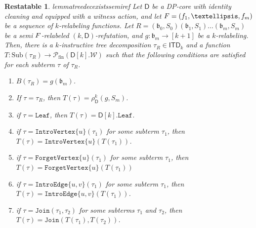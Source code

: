 \documentclass[10pt,a4paper]{amsart}
\newtheorem{restatable}{Restatable}
\newcommand{\abag}{\mathfrak{b}}
\newcommand{\abstractdecomposition}{\tau}
\newcommand{\action}{\rho}
\newcommand{\allabstractdecompositionstreewidth}[1]{\mathsf{ITD}_{#1}}
\newcommand{\allsubterms}{\mathrm{Sub}}
\newcommand{\allwitnesses}{\mathcal{W}}
\newcommand{\dpcore}{\mathsf{D}}
\newcommand{\dprefutation}{R}
\newcommand{\finitepowerset}[1]{\mathcal{P}_{\mathrm{fin}}(#1)}
\newcommand{\forgetvertextype}[1]{\mathtt{ForgetVertex}\{#1\}}
\newcommand{\initialsetgeneric}{\mathtt{Leaf}}
\newcommand{\introedgegeneric}[2]{\mathtt{IntroEdge}\{#1,#2\}}
\newcommand{\introvertextype}[1]{\mathtt{IntroVertex}\{#1\}}
\newcommand{\jointype}{\mathtt{Join}}
\newcommand{\leaftype}{\mathtt{Leaf}}
\newcommand{\relabelingfunction}{f}
\newcommand{\relabelsequence}{\textsc{F}}
\newcommand{\subtermToBag}{T}
\newcommand{\topbag}[1]{\topbagname(#1)}
\newcommand{\topbagname}{B}
\newcommand{\treewidthvalue}{k}
\newcommand{\vertexone}{u}
\newcommand{\vertextwo}{v}
\newcommand{\witnessset}{S}
\begin{document}
		\begin{restatable}{lemma}{treedecexistssemiref}
		\label{lemma:tree decomposition-existence-sequence-relabel-semi-refutation}
		Let $\dpcore$ be a DP-core with identity cleaning and equipped with a witness action, and let $\relabelsequence=(\relabelingfunction_1,\dots,\relabelingfunction_m)$ be a sequence of $k$-relabeling functions. Let  $\dprefutation =(\abag_0,\witnessset_0)(\abag_1,\witnessset_1)\dots(\abag_m,\witnessset_m)$ be a semi $\relabelsequence$-relabeled $(\treewidthvalue,\dpcore)$-refutation, and $g:\abag_m\to [\treewidthvalue+1]$ be a $\treewidthvalue$-relabeling.
	Then, there is a $\treewidthvalue$-instructive tree decomposition $\abstractdecomposition_{\dprefutation}\in \allabstractdecompositionstreewidth{\treewidthvalue}$ and a function
	$\subtermToBag: \allsubterms(\abstractdecomposition_{\dprefutation}) \to \finitepowerset{\dpcore[\treewidthvalue].\allwitnesses}$
	such that the following conditions are satisfied for each subterm $\abstractdecomposition$ of $\abstractdecomposition_{\dprefutation}$.
\begin{enumerate}
    \item\label{existenceZero} $\topbag{\abstractdecomposition_{\dprefutation}} = g(\abag_m)$.
    \item\label{existenceOne} If $\abstractdecomposition=\abstractdecomposition_{\dprefutation}$, then $\subtermToBag(\abstractdecomposition) = \action_{\dpcore}^{\treewidthvalue}(g,\witnessset_m)$.
    \item\label{existenceTwo} if $\abstractdecomposition = \leaftype$, then
    $\subtermToBag(\abstractdecomposition) = \dpcore[\treewidthvalue].\initialsetgeneric$.
    \item\label{existenceThree} if $\abstractdecomposition = \introvertextype{\vertexone}(\abstractdecomposition_1)$ for some subterm $\abstractdecomposition_1$, then
    $\subtermToBag(\abstractdecomposition) = \introvertextype{\vertexone}(\subtermToBag(\abstractdecomposition_1))$.
    \item\label{existenceFour} if $\abstractdecomposition = \forgetvertextype{\vertexone}(\abstractdecomposition_1)$ for some subterm $\abstractdecomposition_1$, then
    $\subtermToBag(\abstractdecomposition) = \forgetvertextype{\vertexone}(\subtermToBag(\abstractdecomposition_1))$
    \item\label{existenceFive} if $\abstractdecomposition = \introedgegeneric{\vertexone}{\vertextwo}(\abstractdecomposition_1)$ for some subterm $\abstractdecomposition_1$, then
    $\subtermToBag(\abstractdecomposition) = \introedgegeneric{\vertexone}{\vertextwo}(\subtermToBag(\abstractdecomposition_1))$.
    \item\label{existenceSix} if $\abstractdecomposition = \jointype(\abstractdecomposition_1,\abstractdecomposition_2)$ for some subterms $\abstractdecomposition_1$ and $\abstractdecomposition_2$, then $\subtermToBag(\abstractdecomposition) = \jointype(\subtermToBag(\abstractdecomposition_1),\subtermToBag(\abstractdecomposition_2))$.
\end{enumerate}
\end{restatable}
\end{document}
